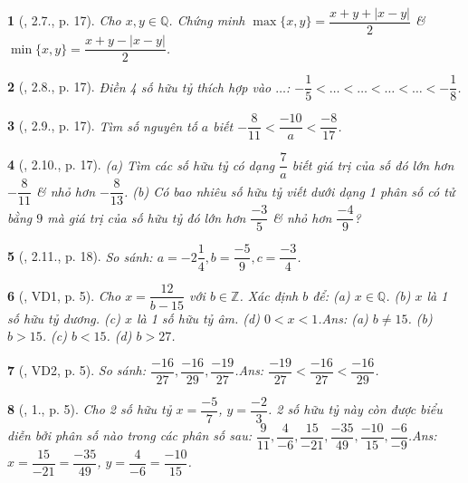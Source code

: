 \documentclass{article}
\newtheorem{baitoan}{}
\begin{document}
\begin{baitoan}[\cite{Binh_boi_duong_Toan_7_tap_1}, 2.7., p. 17]
	Cho $x,y\in\mathbb{Q}$. Chứng minh $\max\{x,y\} = \dfrac{x + y + |x - y|}{2}$ \& $\min\{x,y\} = \dfrac{x + y -|x - y|}{2}$.
\end{baitoan}

\begin{baitoan}[\cite{Binh_boi_duong_Toan_7_tap_1}, 2.8., p. 17]
	Điền 4 số hữu tỷ thích hợp vào $\ldots$: $-\dfrac{1}{5} < \ldots < \ldots < \ldots < \ldots < -\dfrac{1}{8}$.
\end{baitoan}

\begin{baitoan}[\cite{Binh_boi_duong_Toan_7_tap_1}, 2.9., p. 17]
	Tìm số nguyên tố $a$ biết $-\dfrac{8}{11} < \dfrac{-10}{a} < \dfrac{-8}{17}$.
\end{baitoan}

\begin{baitoan}[\cite{Binh_boi_duong_Toan_7_tap_1}, 2.10., p. 17]
	(a) Tìm các số hữu tỷ có dạng $\dfrac{7}{a}$ biết giá trị của số đó lớn hơn $-\dfrac{8}{11}$ \& nhỏ hơn $-\dfrac{8}{13}$. (b) Có bao nhiêu số hữu tỷ viết dưới dạng 1 phân số có tử bằng $9$ mà giá trị của số hữu tỷ đó lớn hơn $\dfrac{-3}{5}$ \& nhỏ hơn $\dfrac{-4}{9}$?
\end{baitoan}

\begin{baitoan}[\cite{Binh_boi_duong_Toan_7_tap_1}, 2.11., p. 18]
	So sánh: $a = -2\dfrac{1}{4},b = \dfrac{-5}{9},c = \dfrac{-3}{4}$.
\end{baitoan}

\begin{baitoan}[\cite{Tuyen_Toan_7}, VD1, p. 5]
	Cho $x = \dfrac{12}{b - 15}$ với $b\in\mathbb{Z}$. Xác định $b$ để: (a) $x\in\mathbb{Q}$. (b) $x$ là 1 số hữu tỷ dương. (c) $x$ là 1 số hữu tỷ âm. (d) $0 < x < 1$.\hfill{\sf Ans: (a) $b\ne 15$. (b) $b > 15$. (c) $b < 15$. (d) $b > 27$.}
\end{baitoan}

\begin{baitoan}[\cite{Tuyen_Toan_7}, VD2, p. 5]
	So sánh: $\dfrac{-16}{27},\dfrac{-16}{29},\dfrac{-19}{27}$.\hfill{\sf Ans: $\dfrac{-19}{27} < \dfrac{-16}{27} < \dfrac{-16}{29}$.}
\end{baitoan}

\begin{baitoan}[\cite{Tuyen_Toan_7}, 1., p. 5]
	Cho 2 số hữu tỷ $x = \dfrac{-5}{7}$, $y = \dfrac{-2}{3}$. 2 số hữu tỷ này còn được biểu diễn bởi phân số nào trong các phân số sau: $\dfrac{9}{11},\dfrac{4}{-6},\dfrac{15}{-21},\dfrac{-35}{49},\dfrac{-10}{15},\dfrac{-6}{-9}$.\hfill{\sf Ans: $x = \dfrac{15}{-21} = \dfrac{-35}{49}$, $y = \dfrac{4}{-6} = \dfrac{-10}{15}$.}
\end{baitoan}
\end{document}
